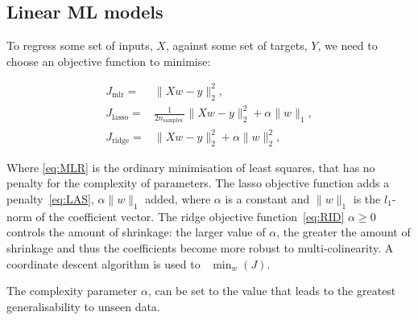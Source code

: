 \subsection{Linear ML models}

To regress some set of inputs, $X$, against
some set of targets, $Y$,
we need to choose an objective function to minimise:

\begin{align}
J_{\mathrm{mlr}} = & \|X w-y\|_{2}^{2} \tag{MLR}, \label{eq:MLR} \\
J_{\mathrm{lasso}} = &
\frac{1}{2 n_{\text {samples }}}\|X w-y\|_{2}^{2}+\alpha\|w\|_{1} \tag{LAS}, \label{eq:LAS} \\
J_{\mathrm{ridge}} = &  \|X w-y\|_{2}^{2}+\alpha\|w\|_{2}^{2} \tag{RID}, \label{eq:RID}
\end{align}

Where \ref{eq:MLR} is the ordinary minimisation of least squares, that has no
penalty for the complexity of parameters.
The lasso objective function adds a penalty~\ref{eq:LAS},
$\alpha\|w\|_{1}$ added, where $\alpha$ is a constant and $\|w\|_{1}$ is the
$l_1$-norm of the coefficient vector.
The ridge objective function~\ref{eq:RID}
$\alpha\ge0$ controls the amount of shrinkage:
the larger value of $\alpha$,
the greater the amount of shrinkage
and thus the coefficients become more robust to multi-colinearity.
A coordinate descent algorithm is used to~\cite{scikit-learn}
$
\min _{w} (J)
$.

The complexity parameter $\alpha$, can be set to
the value that leads to the greatest generalisability to unseen data.
